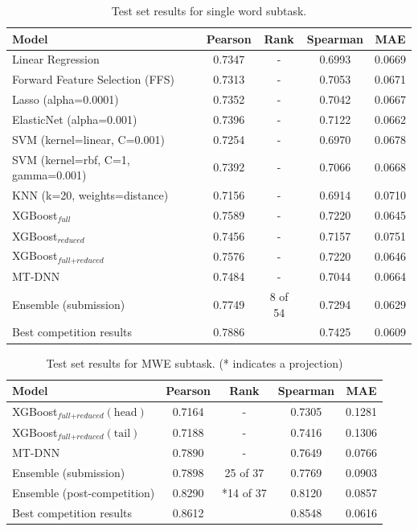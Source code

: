 \documentclass{dcthesis}
\theoremstyle{definition}
\theoremstyle{remark}
\begin{document}
\begin{table}[!htbp]
  \centering
  \begin{tabular}{lcccc}
    \hline \textbf{Model} & \textbf{Pearson} & \textbf{Rank} & \textbf{Spearman} & \textbf{MAE} \\ \hline
    Linear Regression	& 0.7347 & - &	0.6993 &	0.0669 \\
    Forward Feature Selection (FFS)	& 0.7313 & - &	0.7053 & 0.0671 \\
    Lasso (alpha=0.0001) &	0.7352 & - &	0.7042 & 	0.0667 \\
    ElasticNet (alpha=0.001) &	0.7396 & - &	0.7122 &	0.0662 \\
    SVM (kernel=linear, C=0.001) &	0.7254 & - &	0.6970 &	0.0678 \\
    SVM (kernel=rbf, C=1, gamma=0.001) &	0.7392 & - &	0.7066 &	0.0668 \\
    KNN (k=20, weights=distance) &	0.7156 & -	& 0.6914 &	0.0710 \\
    \hline
    XGBoost$_\textit{full}$ &	0.7589 & - &	0.7220 &	0.0645 \\
    XGBoost$_\textit{reduced}$ &	0.7456 & - &	0.7157 &	0.0751 \\
    XGBoost$_{\textit{full}+\textit{reduced}}$ & 0.7576 & - & 0.7220 & 0.0646 \\
    MT-DNN & 0.7484 & -	& 0.7044 & 0.0664 \\
    Ensemble (submission) & 0.7749 & 8 of 54 & 0.7294 & 0.0629 \\
    \hline
    Best competition results & 0.7886 & & 0.7425 & 0.0609 \\ 
    \hline
  \end{tabular}
  \caption{\label{tab:single-word-results} Test set results for single word subtask. }
\end{table}

\begin{table}[!htbp]
  \centering
  \begin{tabular}{lcccc}
    \hline \textbf{Model} & \textbf{Pearson} & \textbf{Rank} & \textbf{Spearman} & \textbf{MAE} \\ \hline
    XGBoost$_{\textit{full}+\textit{reduced}}(\text{head})$ & 0.7164 & - & 0.7305 & 0.1281 \\
    XGBoost$_{\textit{full}+\textit{reduced}}(\text{tail})$ & 0.7188 & - & 0.7416 & 0.1306 \\
    MT-DNN & 0.7890 & - & 0.7649 & 0.0766 \\
    Ensemble (submission) & 0.7898 & 25 of 37 & 0.7769 & 0.0903 \\
    Ensemble (post-competition) & 0.8290 & *14 of 37 & 0.8120 & 0.0857 \\
    \hline
    Best competition results & 0.8612 & &  0.8548 & 0.0616 \\ 
    \hline
  \end{tabular}
  \caption{\label{tab:multi-word-results} Test set results for MWE subtask. (* indicates a projection)}
\end{table}
\end{document}
